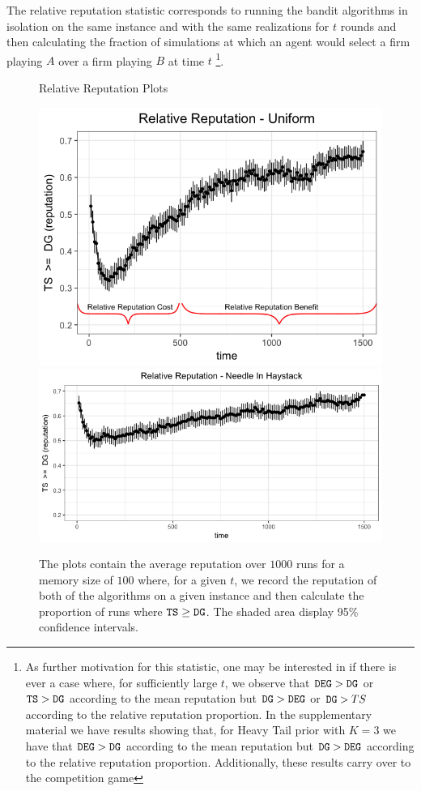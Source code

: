 \documentclass[../competing_bandits.tex]{subfiles}
\begin{document}
{The relative reputation statistic corresponds to running the bandit algorithms in isolation on the same instance and with the same realizations for $t$ rounds and then calculating the fraction of simulations at which an agent would select a firm playing $A$ over a firm playing $B$ at time $t$ \footnote{As further motivation for this statistic, one may be interested in if there is ever a case where, for sufficiently large $t$, we observe that $\mathtt{DEG} >\mathtt{DG}$ or $\mathtt{TS} > \mathtt{DG}$ according to the mean reputation but $\mathtt{DG} > \mathtt{DEG}$ or $\mathtt{DG} > TS$ according to the relative reputation proportion. In the supplementary material we have results showing that, for Heavy Tail prior with $K=3$ we have that $\mathtt{DEG} > \mathtt{DG}$ according to the mean reputation but $\mathtt{DG} > \mathtt{DEG}$ according to the relative reputation proportion. Additionally, these results carry over to the competition game}.

\begin{figure}[ht]
\caption{Relative Reputation Plots}
\includegraphics[scale=0.35]{figures/relative_uniform_annotated_plot}
\includegraphics[scale=0.35]{figures/ts_dg_nih_10_prelim}
\caption*{\tiny{The plots contain the average reputation over $1000$ runs for a memory size of $100$ where, for a given $t$, we record the reputation of both of the algorithms on a given instance and then calculate the proportion of runs where $\mathtt{TS} \geq \mathtt{DG}$. The shaded area display 95\% confidence intervals.}}
\label{relative_rep_plots}


\end{figure}}
\end{document}
